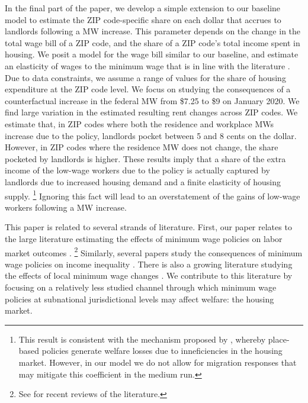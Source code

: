 In the final part of the paper, we develop a simple extension to our baseline 
model to estimate the ZIP code-specific share on each dollar that accrues to 
landlords following a MW increase.
This parameter depends on the change in the total wage bill of a ZIP code, and 
the share of a ZIP code's total income spent in housing.
We posit a model for the wage bill similar to our baseline, and estimate an 
elasticity of wages to the minimum wage that is in line with the literature
\parencite[e.g.,][]{CegnizEtAl2019}.
Due to data constraints, we assume a range of values for the share of housing
expenditure at the ZIP code level.
We focus on studying the consequences of a counterfactual increase in the federal 
MW from \$7.25 to \$9 on January 2020.
We find large variation in the estimated resulting rent changes across ZIP codes.
We estimate that, in ZIP codes where both the residence and workplace MWs increase
due to the policy, landlords pocket between 5 and 8 cents on the dollar.
However, in ZIP codes where the residence MW does not change, the share pocketed
by landlords is higher. 
These results imply that a share of the extra income of the low-wage workers
due to the policy is actually captured by landlords due to increased housing 
demand and a finite elasticity of housing supply.%
\footnote{This result is consistent with the mechanism proposed by 
\textcite{KlineMoretti2014}, whereby place-based policies generate welfare 
losses due to inneficiencies in the housing market.
However, in our model we do not allow for migration responses that may mitigate 
this coefficient in the medium run.}
Ignoring this fact will lead to an overstatement of the gains of low-wage 
workers following a MW increase.


This paper is related to several strands of literature.
First, our paper relates to the large literature estimating the effects of 
minimum wage policies on labor market outcomes
\parencite{CardKrueger1994,NeumarkWascher2007,MeerWest2016,CegnizEtAl2019}.%
\footnote{See \textcite{Dube2019, NeumarkShirley2021} for recent reviews of the 
literature.}
Similarly, several papers study the consequences of minimum wage policies on 
income inequality \parencite{Lee1999, AutorEtAl2016}.
There is also a growing literature studying the effects of local minimum wage 
changes \parencite{DubeNaiduReich2007,SchmittRosnick2011,DubeLindner2021}.
We contribute to this literature by focusing on a relatively less studied 
channel through which minimum wage policies at subnational jurisdictional 
levels may affect welfare: the housing market.


